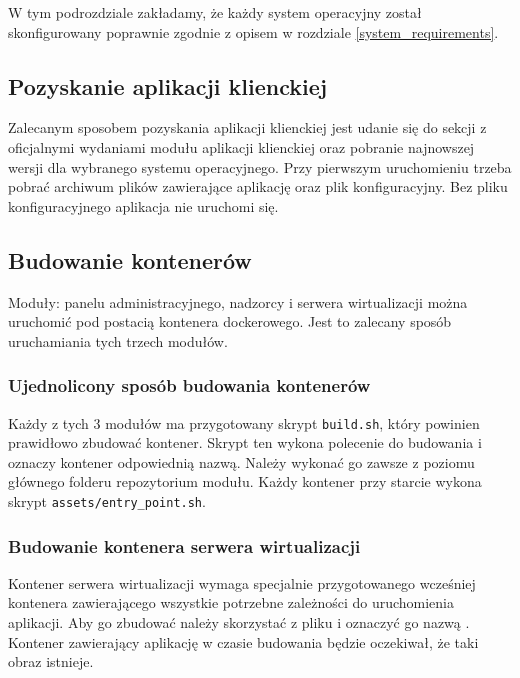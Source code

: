 \documentclass[../opis-rozwiazania.tex]{subfiles}
\begin{document}
\label{system_startup}

W tym podrozdziale zakładamy, że każdy system operacyjny został skonfigurowany poprawnie zgodnie z opisem w rozdziale \ref{system_requirements}.

\subsection{Pozyskanie aplikacji klienckiej}
\label{system_startup.client_obtaining}
Zalecanym sposobem pozyskania aplikacji klienckiej jest udanie się do sekcji z oficjalnymi wydaniami \parencite{ocd-client-releases} modułu aplikacji klienckiej oraz pobranie najnowszej wersji dla wybranego systemu operacyjnego.
Przy pierwszym uruchomieniu trzeba pobrać archiwum plików zawierające aplikację oraz plik konfiguracyjny.
Bez pliku konfiguracyjnego aplikacja nie uruchomi się.

\subsection{Budowanie kontenerów}
\label{system_startup.containers}

Moduły: panelu administracyjnego, nadzorcy i serwera wirtualizacji można uruchomić pod postacią kontenera dockerowego.
Jest to zalecany sposób uruchamiania tych trzech modułów.

\subsubsection{Ujednolicony sposób budowania kontenerów}
Każdy z tych 3 modułów ma przygotowany skrypt \texttt{build.sh}, który powinien prawidłowo zbudować kontener.
Skrypt ten wykona polecenie do budowania i oznaczy kontener odpowiednią nazwą.
Należy wykonać go zawsze z poziomu głównego folderu repozytorium modułu.
Każdy kontener przy starcie wykona skrypt \texttt{assets/entry\_point.sh}.

\subsubsection{Budowanie kontenera serwera wirtualizacji}
Kontener serwera wirtualizacji wymaga specjalnie przygotowanego wcześniej kontenera zawierającego wszystkie potrzebne zależności do uruchomienia aplikacji.
Aby go zbudować należy skorzystać z pliku \texttt{} i oznaczyć go nazwą \texttt{}.
Kontener zawierający aplikację w czasie budowania będzie oczekiwał, że taki obraz istnieje.
\end{document}
